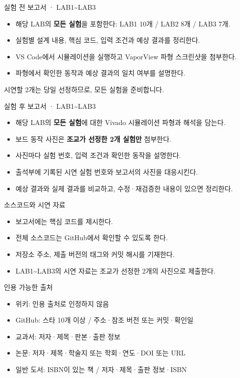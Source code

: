 \documentclass[aspectratio=169,11pt,t]{beamer}
\begin{document}
\begin{frame}{실험 전 보고서 · LAB1\textasciitilde{}LAB3}
\begin{itemize}
\item 해당 LAB의 \textbf{모든 실험}을 포함한다: LAB1 10개 / LAB2 8개 / LAB3 7개.
\item 실험별 설계 내용, 핵심 코드, 입력 조건과 예상 결과를 정리한다.
\item VS Code에서 시뮬레이션을 실행하고 VaporView 파형 스크린샷을 첨부한다.
\item 파형에서 확인한 동작과 예상 결과의 일치 여부를 설명한다.
\end{itemize}
\vspace{0.25cm}
시연할 2개는 당일 선정하므로, 모든 실험을 준비합니다.
\end{frame}

\begin{frame}{실험 후 보고서 · LAB1\textasciitilde{}LAB3}
\begin{itemize}
\item 해당 LAB의 \textbf{모든 실험}에 대한 Vivado 시뮬레이션 파형과 해석을 담는다.
\item 보드 동작 사진은 \textbf{조교가 선정한 2개 실험만} 첨부한다.
\item 사진마다 실험 번호, 입력 조건과 확인한 동작을 설명한다.
\item 출석부에 기록된 시연 실험 번호와 보고서의 사진을 대응시킨다.
\item 예상 결과와 실제 결과를 비교하고, 수정·재검증한 내용이 있으면 정리한다.
\end{itemize}
\end{frame}

\begin{frame}{소스코드와 시연 자료}
\begin{itemize}
\item 보고서에는 핵심 코드를 제시한다.
\item 전체 소스코드는 GitHub에서 확인할 수 있도록 한다.
\item 저장소 주소, 제출 버전의 태그와 커밋 해시를 기재한다.
\item LAB1\textasciitilde{}LAB3의 시연 자료는 조교가 선정한 2개의 사진으로 제출한다.
\end{itemize}
\end{frame}

\begin{frame}{인용 가능한 출처}
\begin{itemize}
\item 위키: 인용 출처로 인정하지 않음
\item GitHub: 스타 10개 이상 / 주소·참조 버전 또는 커밋·확인일
\item 교과서: 저자·제목·판본·출판 정보
\item 논문: 저자·제목·학술지 또는 학회·연도·DOI 또는 URL
\item 일반 도서: ISBN이 있는 책 / 저자·제목·출판 정보·ISBN
\end{itemize}
\end{frame}
\end{document}
